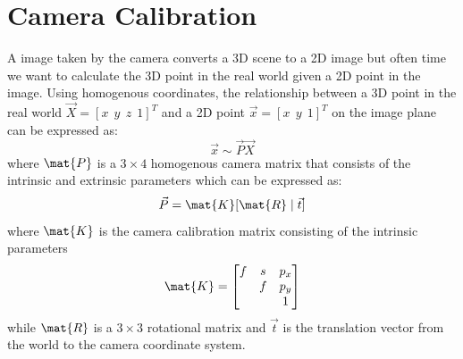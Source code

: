 \section{Camera Calibration}
\label{sec:camera_calibration}
A image taken by the camera converts a 3D scene to a 2D image but often time we 
want to calculate the 3D point in the real world given a 2D point in the image. 
Using homogenous coordinates, the relationship between a 3D point in the real 
world $\vec{X} = [x\ \ y\ \ z\ \ 1]^T$ and a 2D point $\vec{x} = [x\ \ y\ \ 
1]^T$ on the image plane can be expressed as: 
\begin{equation}
  \label{eq:camera_equation}
  \vec{x} \sim \vec{P}\vec{X}
\end{equation} 
where $\mat{P}$ is a $3 \times 4$ homogenous camera matrix that consists of the 
intrinsic and extrinsic parameters which can be expressed as: 
\begin{equation}\vec{P} = \mat{K}[\mat{R}\mid\vec{t}]\end{equation} \label{eq:camera_equation_2}
where $\mat{K}$ is the camera calibration matrix consisting of the intrinsic 
parameters
$$\mat{K} = \begin{bmatrix}f&s&p_{x}\\&f&p_{y}\\&&1\end{bmatrix}$$
while $\mat{R}$ is a $3 \times 3$ rotational matrix and $\vec{t}$ is the 
translation vector from the world to the camera coordinate system. 
